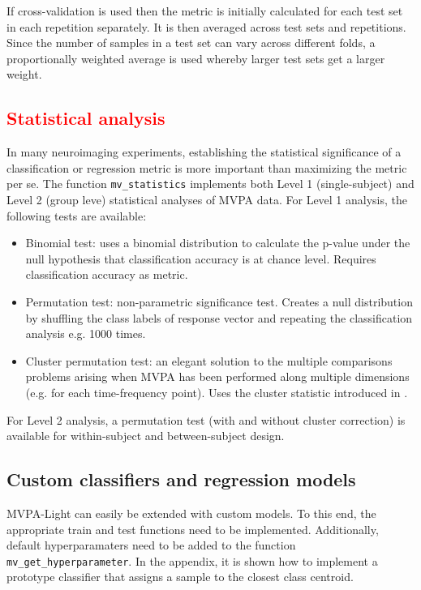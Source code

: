 \documentclass[utf8]{frontiersSCNS} %
\newcommand{\ttt}[1]{\texttt{#1}}
\newcommand{\red}[1]{\textcolor{red}{#1}}
\begin{document}
If cross-validation is used then the metric is initially calculated for each test set in each repetition separately. It is then averaged across test sets and repetitions. Since the number of samples in a test set can vary across different folds, a proportionally weighted average is used whereby larger test sets get a larger weight.

\red{\subsection{Statistical analysis}\label{sec:statistics}}

In many neuroimaging experiments, establishing the statistical significance of a classification or regression metric is more important than maximizing the metric per se. The function \ttt{mv\_statistics} implements both Level 1 (single-subject) and Level 2 (group leve) statistical analyses of MVPA data. For Level 1 analysis, the following tests are available:

\begin{itemize}
    \item Binomial test: uses a binomial distribution to calculate the p-value under the null hypothesis that classification accuracy is at chance level. Requires classification accuracy as metric.
    \item Permutation test: non-parametric significance test. Creates a null distribution by shuffling the class labels of response vector and repeating the classification analysis e.g. 1000 times. 
    \item Cluster permutation test: an elegant solution to the multiple comparisons problems arising when MVPA has been performed along multiple dimensions (e.g. for each time-frequency point). Uses the cluster statistic introduced in 
    \cite{Maris2007}.
\end{itemize}

For Level 2 analysis, a permutation test (with and without cluster correction) is available for within-subject and between-subject design.

\subsection{Custom classifiers and regression models}

MVPA-Light can easily be extended with custom models. To this end, the appropriate train and test functions need to be implemented. Additionally, default hyperparamaters need to be added to the function \ttt{mv\_get\_hyperparameter}. In the appendix, it is shown how to implement a prototype classifier that assigns a sample to the closest class centroid.
\end{document}
